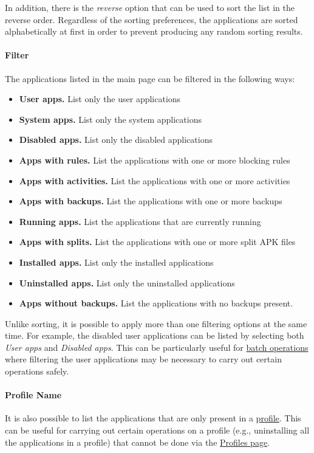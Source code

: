 In addition, there is the \textit{reverse} option that can be used to sort the list in the reverse order. Regardless of
the sorting preferences, the applications are sorted alphabetically at first in order to prevent producing any random
sorting results.

\paragraph{Filter}\hypertarget{par:main-page-filter}{} %
The applications listed in the main page can be filtered in the following ways:
\begin{itemize}
    \item \textbf{User apps.} List only the user applications
    \item \textbf{System apps.} List only the system applications
    \item \textbf{Disabled apps.} List only the disabled applications
    \item \textbf{Apps with rules.} List the applications with one or more blocking rules
    \item \textbf{Apps with activities.} List the applications with one or more activities
    \item \textbf{Apps with backups.} List the applications with one or more backups
    \item \textbf{Running apps.} List the applications that are currently running
    \item \textbf{Apps with splits.} List the applications with one or more split APK files
    \item \textbf{Installed apps.} List only the installed applications
    \item \textbf{Uninstalled apps.} List only the uninstalled applications
    \item \textbf{Apps without backups.} List the applications with no backups present.
\end{itemize}

Unlike sorting, it is possible to apply more than one filtering options at the same time. For example, the disabled user
applications can be listed by selecting both \textit{User apps} and \textit{Disabled apps}. This can be particularly
useful for \hyperref[subsec:batch-operations]{batch operations} where filtering the user applications may be necessary
to carry out certain operations safely.

\paragraph{Profile Name}%
It is also possible to list the applications that are only present in a \hyperref[sec:profiles-page]{profile}. This can
be useful for carrying out certain operations on a profile (e.g., uninstalling all the applications in a profile) that
cannot be done via the \hyperref[sec:profiles-page]{Profiles page}.

